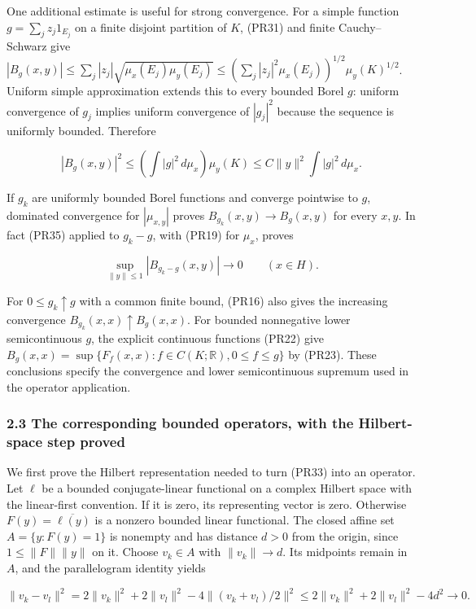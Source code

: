 \documentclass[
  11pt,
]{article}
\begin{document}
One additional estimate is useful for strong convergence. For a simple
function \(g=\sum_jz_j1_{E_j}\) on a finite disjoint partition of \(K\),
(PR31) and finite Cauchy--Schwarz give
\(|B_g(x,y)|\leq\sum_j|z_j|\sqrt{\mu_x(E_j)\mu_y(E_j)}\leq(\sum_j|z_j|^2\mu_x(E_j))^{1/2}\mu_y(K)^{1/2}\).
Uniform simple approximation extends this to every bounded Borel \(g\):
uniform convergence of \(g_j\) implies uniform convergence of
\(|g_j|^2\) because the sequence is uniformly bounded. Therefore

\[
|B_g(x,y)|^2\leq\left(\int|g|^2\,d\mu_x\right)\mu_y(K)
\leq C\|y\|^2\int|g|^2\,d\mu_x.
\tag{PR35}
\]

If \(g_k\) are uniformly bounded Borel functions and converge pointwise
to \(g\), dominated convergence for \(|\mu_{x,y}|\) proves
\(B_{g_k}(x,y)\to B_g(x,y)\) for every \(x,y\). In fact (PR35) applied
to \(g_k-g\), with (PR19) for \(\mu_x\), proves

\[
\sup_{\|y\|\leq1}|B_{g_k-g}(x,y)|\longrightarrow0
\qquad(x\in H).
\tag{PR36}
\]

For \(0\leq g_k\uparrow g\) with a common finite bound, (PR16) also
gives the increasing convergence \(B_{g_k}(x,x)\uparrow B_g(x,x)\). For
bounded nonnegative lower semicontinuous \(g\), the explicit continuous
functions (PR22) give
\(B_g(x,x)=\sup\{F_f(x,x):f\in C(K;\mathbb R),0\leq f\leq g\}\) by
(PR23). These conclusions specify the convergence and lower
semicontinuous supremum used in the operator application.

\subsubsection{2.3 The corresponding bounded operators, with the
Hilbert-space step
proved}\label{the-corresponding-bounded-operators-with-the-hilbert-space-step-proved}

We first prove the Hilbert representation needed to turn (PR33) into an
operator. Let \(\ell\) be a bounded conjugate-linear functional on a
complex Hilbert space with the linear-first convention. If it is zero,
its representing vector is zero. Otherwise \(F(y)=\overline{\ell(y)}\)
is a nonzero bounded linear functional. The closed affine set
\(A=\{y:F(y)=1\}\) is nonempty and has distance \(d>0\) from the origin,
since \(1\leq\|F\|\|y\|\) on it. Choose \(v_k\in A\) with
\(\|v_k\|\to d\). Its midpoints remain in \(A\), and the parallelogram
identity yields

\[
\|v_k-v_l\|^2
=2\|v_k\|^2+2\|v_l\|^2-4\|(v_k+v_l)/2\|^2
\leq2\|v_k\|^2+2\|v_l\|^2-4d^2\longrightarrow0.
\tag{PR37}
\]
\end{document}
